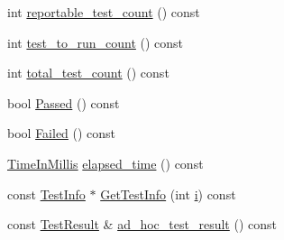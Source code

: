 \begin{DoxyCompactItemize}
\item 
int \mbox{\hyperlink{classtesting_1_1_test_case_ae4e69f1a77b6aba274981e987e50acab}{reportable\+\_\+test\+\_\+count}} () const
\item 
int \mbox{\hyperlink{classtesting_1_1_test_case_a57f115315eb756e23be6651bb5e6c638}{test\+\_\+to\+\_\+run\+\_\+count}} () const
\item 
int \mbox{\hyperlink{classtesting_1_1_test_case_aba3cab19aaf7295284f0832f2cf895a3}{total\+\_\+test\+\_\+count}} () const
\item 
bool \mbox{\hyperlink{classtesting_1_1_test_case_a29bbfd227b732a90198b5280c039c271}{Passed}} () const
\item 
bool \mbox{\hyperlink{classtesting_1_1_test_case_ae71c30eab6f1673b82090a0e745c2aa5}{Failed}} () const
\item 
\mbox{\hyperlink{namespacetesting_a992de1d091ce660f451d1e8b3ce30fd6}{Time\+In\+Millis}} \mbox{\hyperlink{classtesting_1_1_test_case_acd7d6a77bce06da6ef90f5dad1c4def1}{elapsed\+\_\+time}} () const
\item 
const \mbox{\hyperlink{classtesting_1_1_test_info}{Test\+Info}} $\ast$ \mbox{\hyperlink{classtesting_1_1_test_case_a441e0eca232643671dc365c2924c255c}{Get\+Test\+Info}} (int \mbox{\hyperlink{_obj__test_2lib_2googletest-master_2googlemock_2test_2gmock-matchers__test_8cc_acb559820d9ca11295b4500f179ef6392}{i}}) const
\item 
const \mbox{\hyperlink{classtesting_1_1_test_result}{Test\+Result}} \& \mbox{\hyperlink{classtesting_1_1_test_case_a6d5fc5003bc3352f3ddae7dadc6d2364}{ad\+\_\+hoc\+\_\+test\+\_\+result}} () const
\end{DoxyCompactItemize}
